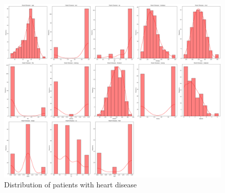 \begin{figure}[!htb]
    \centering
    \includegraphics[width=1\linewidth]{images/heart_distribution.png}
    \caption{Distribution of patients with heart disease}
    \label{fig:heart_distribution}
\end{figure}

